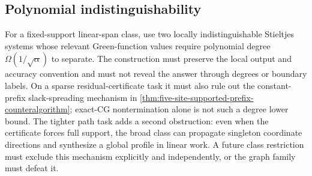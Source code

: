 \subsection{Polynomial indistinguishability}

For a fixed-support linear-span class, use two locally indistinguishable
Stieltjes systems whose relevant Green-function values require polynomial
degree $\Omega(1/\sqrt\alpha)$ to separate.  The construction must preserve
the local output and accuracy convention and must not reveal the answer through
degrees or boundary labels.  On a sparse residual-certificate task it must
also rule out the constant-prefix slack-spreading mechanism in
\cref{thm:five-site-supported-prefix-counteralgorithm}; exact-CG
nontermination alone is not such a degree lower bound.  The tighter path task
adds a second obstruction: even when the certificate forces full support, the
broad class can propagate singleton coordinate directions and synthesize a
global profile in linear work.  A future class restriction must exclude this
mechanism explicitly and independently, or the graph family must defeat it.
